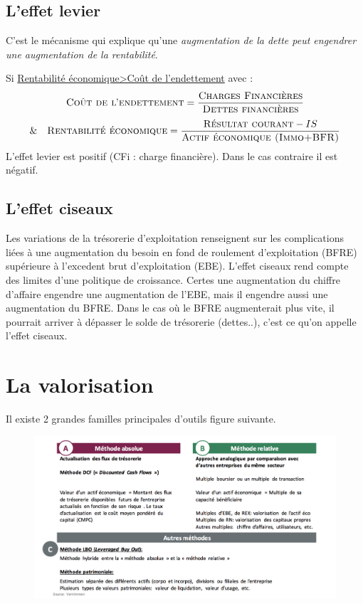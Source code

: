 \documentclass[12pt,oneside,a4paper]{article}
\begin{document}

\subsection{L'effet levier} %
\label{sub:l_effet_levier}

C'est le mécanisme qui explique qu’une \emph{augmentation de la dette peut engendrer une augmentation de la rentabilité}.

	Si \underline{Rentabilité économique>Coût de l'endettement} avec :
	\[
		\textsc{Coût de l'endettement} =\frac{\textsc{Charges Financières}}{\textsc{Dettes financières}}
	\]
	\[
		\& \quad\textsc{Rentabilité économique} = \frac{\textsc{Résultat courant}-IS}{\textsc{Actif économique (Immo+BFR)}}
	\]
	L'effet levier est positif (CFi : charge financière). Dans le cas contraire il est négatif. 


\subsection{L'effet ciseaux} %
\label{sub:leffet_ciseaux}

Les variations de la trésorerie d'exploitation renseignent sur les complications liées à une augmentation du besoin en fond de roulement d'exploitation (BFRE) supérieure à l'excedent brut d'exploitation (EBE). L'effet ciseaux rend compte des limites d'une politique de croissance. Certes une augmentation du chiffre d'affaire engendre une augmentation de l'EBE, mais il engendre aussi une augmentation du BFRE. Dans le cas où le BFRE augmenterait plus vite, il pourrait arriver à dépasser le solde de trésorerie (dettes..), c'est ce qu'on appelle l'effet ciseaux.

\section{La valorisation} %
\label{sec:la_valorisation}

Il existe 2 grandes familles principales d'outils figure suivante.

\begin{figure}[H]
	\centering
	\includegraphics[scale=0.5]{img/im2}
	\label{fig:1}
\end{figure}
\end{document}
